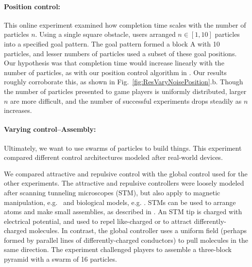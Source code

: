 \paragraph{Position control:}
This online experiment examined how completion time scales with the number of particles $n$. Using a single square obstacle, users arranged $n\in[1,10]$ particles into a specified goal pattern.  The goal pattern formed a block  {\sffamily A} with 10 particles, and lesser numbers of particles used a subset of these goal positions. Our hypothesis was that completion time would increase linearly with the number of particles, as with our position control algorithm in \cite{Becker2013b}.  Our results roughly corroborate this, as shown in Fig.~\ref{fig:ResVaryNoisePosition}.b.  Though the number of particles presented to game players is uniformly distributed, larger $n$ are more difficult, and the number of successful experiments drops steadily as $n$ increases.





\paragraph{Varying control--Assembly:}
Ultimately, we want to use swarms of particles to build things. This experiment compared different control architectures modeled after real-world devices.

We compared attractive and repulsive control with the global control used for the other experiments. The attractive and repulsive controllers were loosely modeled after scanning tunneling microscopes (STM), but also apply to magnetic manipulation, e.g.\ \cite{Khalil2013} and biological models, e.g. \cite{goodrich2012types}. STMs can be used to arrange atoms and make small assemblies, as described in \cite{avouris1995manipulation}. An STM tip is charged with electrical potential, and used to repel like-charged or to attract differently-charged molecules. In contrast, the global controller uses a uniform field (perhaps formed by parallel lines of differently-charged conductors) to pull molecules in the same direction.
The experiment challenged players to assemble a three-block pyramid with a swarm of 16 particles.


